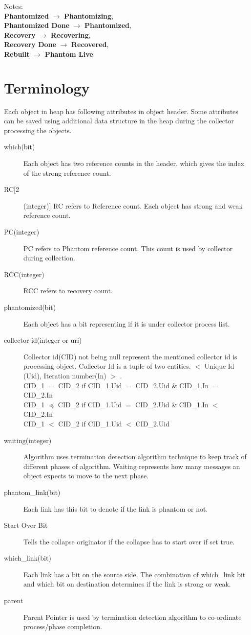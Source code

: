 \documentclass{article}
\begin{document}
Notes:\\
\textbf{Phantomized} $\rightarrow$ \textbf{Phantomizing},\\
\textbf{Phantomized Done} $\rightarrow$ \textbf{Phantomized},\\
\textbf{Recovery} $\rightarrow$ \textbf{Recovering},\\
\textbf{Recovery Done} $\rightarrow$ \textbf{Recovered},\\
\textbf{Rebuilt} $\rightarrow$ \textbf{Phantom Live}\\

\section{Terminology}
Each object in heap has following attributes in object header. Some attributes can be saved using additional data structure in the heap during the collector processing the objects. 
\begin{description}
  \item[which(bit)] Each object has two reference counts in the header. which gives the index of the strong reference count.
  \item[RC[2](integer)] RC refers to Reference count. Each object has strong and weak reference count.
  \item[PC(integer)] PC refers to Phantom reference count. This count is used by collector during collection.
  \item[RCC(integer)] RCC refers to recovery count.
  \item[phantomized(bit)] Each object has a bit representing if it is under collector process list.
  \item[collector id(integer or uri)] Collector id(CID) not being null represent the mentioned collector id is processing object. Collector Id is a tuple of two entities. $<$ Unique Id (Uid), Iteration number(In) $>$ . \\
   CID\_1 $=$ CID\_2 if CID\_1.Uid $=$ CID\_2.Uid \& CID\_1.In $=$ CID\_2.In \\
   CID\_1 $\preceq$ CID\_2 if CID\_1.Uid $=$ CID\_2.Uid \& CID\_1.In $<$ CID\_2.In \\
   CID\_1 $<$ CID\_2 if CID\_1.Uid $<$ CID\_2.Uid \\

  \item[waiting(integer)] Algorithm uses termination detection algorithm technique to keep track of different phases of algorithm. Waiting represents how many messages an object expects to move to the next phase.
  \item[phantom\_link(bit)] Each link has this bit to denote if the link is phantom or not.
  \item[Start Over Bit] Tells the collapse originator if the collapse has to start over if set true.  
  \item[which\_link(bit)] Each link has a bit on the source side. The combination of which\_link bit and which bit on destination determines if the link is strong or weak.
\item[parent] Parent Pointer is used by termination detection algorithm to co-ordinate process/phase completion.
\end{description}
\end{document}
